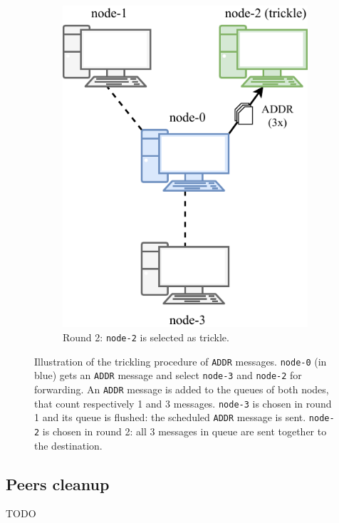 \begin{figure}[h!]
\begin{subfigure}{.4\textwidth}
		\includegraphics[width=\columnwidth]{figures/trickling_2}
		\vspace*{0.1cm}
		\caption{
			Round \num{2}:
			\texttt{node-2} is selected as trickle.
		}
		\vspace*{0.2cm}
	\end{subfigure}
	\caption[Illustration of the trickling procedure]{
		Illustration of the trickling procedure of \texttt{ADDR} messages.
		\texttt{node-0} (in blue) gets an \texttt{ADDR} message and select \texttt{node-3} and \texttt{node-2} for forwarding.
		An \texttt{ADDR} message is added to the queues of both nodes, that count respectively \num{1} and \num{3} messages.
		\texttt{node-3} is chosen in round \num{1} and its queue is flushed:
		the scheduled \texttt{ADDR} message is sent.
		\texttt{node-2} is chosen in round \num{2}:
		all \num{3} messages in queue are sent together to the destination.
	}
	\label{fig:trickling}
\end{figure}

\subsection{Peers cleanup}
TODO

